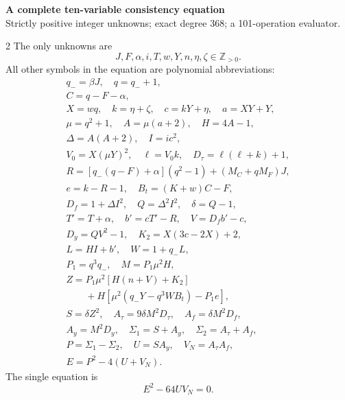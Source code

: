 \documentclass[10pt]{article}
\begin{document}
\begin{center}
{\large\bfseries A complete ten-variable consistency equation}\\[-1pt]
{\small Strictly positive integer unknowns; exact degree 368; a 101-operation evaluator.}
\end{center}\vspace{-8pt}
\begin{multicols}{2}
\fontsize{9}{9.5}\selectfont
The only unknowns are
\[
J,F,\alpha,i,T,w,Y,n,\eta,\zeta\in\mathbb Z_{>0}.
\]
All other symbols in the equation are polynomial abbreviations:
\[
\begin{gathered}
q_-=\beta J,\quad q=q_-+1,\\
C=q-F-\alpha,\\
X=wq,\quad k=\eta+\zeta,\quad c=kY+\eta,\quad a=XY+Y,\\
\mu=q^2+1,\quad A=\mu(a+2),\quad H=4A-1,\\
\Delta=A(A+2),\quad I=ic^2,\\
V_0=X(\mu Y)^2,\quad\ell=V_0k,\quad D_\tau=\ell(\ell+k)+1,\\
R=[q_-(q-F)+\alpha](q^2-1)+(M_C+qM_F)J,\\
e=k-R-1,\quad B_t=(K+w)C-F,\\
D_f=1+\Delta I^2,\quad Q=\Delta^2I^2,\quad\delta=Q-1,\\
T'=T+\alpha,\quad b'=cT'-R,\quad V=D_fb'-c,\\
D_y=QV^2-1,\quad K_2=X(3c-2X)+2,\\
L=HI+b',\quad W=1+q_-L,\\
P_1=q^3q_-,\quad M=P_1\mu^2H,\\
Z=P_1\mu^2[H(n+V)+K_2]\\
\qquad+H[\mu^2(q_-Y-q^3WB_t)-P_1e],\\
S=\delta Z^2,\quad A_\tau=9\delta M^2D_\tau,\quad A_f=\delta M^2D_f,\\
A_y=M^2D_y,\quad\Sigma_1=S+A_y,\quad\Sigma_2=A_\tau+A_f,\\
P=\Sigma_1-\Sigma_2,\quad U=SA_y,\quad V_N=A_\tau A_f,\\
E=P^2-4(U+V_N).
\end{gathered}
\]
The single equation is
\[
\boxed{E^2-64UV_N=0.}
\]


\end{multicols}
\end{document}
